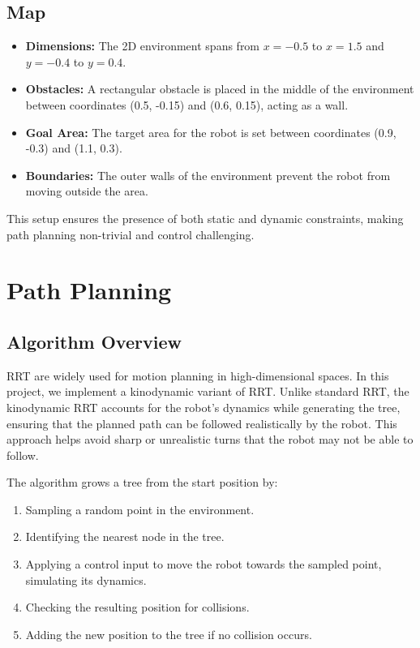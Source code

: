 \documentclass[12pt]{article}
\begin{document}
\subsection{Map}
\begin{itemize}
    \item \textbf{Dimensions:} The 2D environment spans from \(x = -0.5\) to \(x = 1.5\) and \(y = -0.4\) to \(y = 0.4\).
    \item \textbf{Obstacles:} A rectangular obstacle is placed in the middle of the environment between coordinates (0.5, -0.15) and (0.6, 0.15), acting as a wall.
    \item \textbf{Goal Area:} The target area for the robot is set between coordinates (0.9, -0.3) and (1.1, 0.3).
    \item \textbf{Boundaries:} The outer walls of the environment prevent the robot from moving outside the area.
\end{itemize}

This setup ensures the presence of both static and dynamic constraints, making path planning non-trivial and control challenging.

\section{Path Planning}

\subsection{Algorithm Overview}
RRT\cite{planning_dynamics} are widely used for motion planning in high-dimensional spaces. In this project, we implement a kinodynamic variant of RRT. Unlike standard RRT, the kinodynamic RRT accounts for the robot’s dynamics while generating the tree, ensuring that the planned path can be followed realistically by the robot. This approach helps avoid sharp or unrealistic turns that the robot may not be able to follow.

The algorithm grows a tree from the start position by:
\begin{enumerate}
    \item Sampling a random point in the environment.
    \item Identifying the nearest node in the tree.
    \item Applying a control input to move the robot towards the sampled point, simulating its dynamics.
    \item Checking the resulting position for collisions.
    \item Adding the new position to the tree if no collision occurs.
\end{enumerate}
\end{document}
